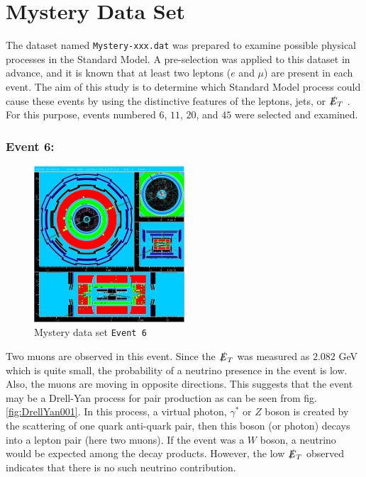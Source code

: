 \section{Mystery Data Set}
\label{sec:mystery}
The dataset named \texttt{Mystery-xxx.dat} was prepared to examine possible physical processes in the Standard Model. A pre-selection was applied to this dataset in advance, and it is known that at least two leptons ($e$ and $\mu$) are present in each event. The aim of this study is to determine which Standard Model process could cause these events by using the distinctive features of the leptons, jets, or $\slashed{E}_T$ \cite{atlaslabmanual}. For this purpose, events numbered $6$, $11$, $20$, and $45$ were selected and examined.

\subsubsection{Event 6:}

\begin{figure}[h]
    \centering
	\includegraphics[width=0.5\textwidth]{../figures/mystery-event6.pdf}
	\caption{Mystery data set \texttt{Event 6}}
    \label{fig:event6}
\end{figure}
\FloatBarrier

Two muons are observed in this event. Since the $\slashed{E}_T$ was measured as $2.082$ GeV which is quite small, the probability of a neutrino presence in the event is low. Also, the muons are moving in opposite directions. This suggests that the event may be a Drell-Yan process for pair production as can be seen from fig.\ref{fig:DrellYan001}. In this process, a virtual photon, $\gamma^*$ or $Z$ boson is created by the scattering of one quark anti-quark pair, then this boson (or photon) decays into a lepton pair (here two muons). If the event was a $W$ boson, a neutrino would be expected among the decay products. However, the low $\slashed{E}_T$ observed indicates that there is no such neutrino contribution.


